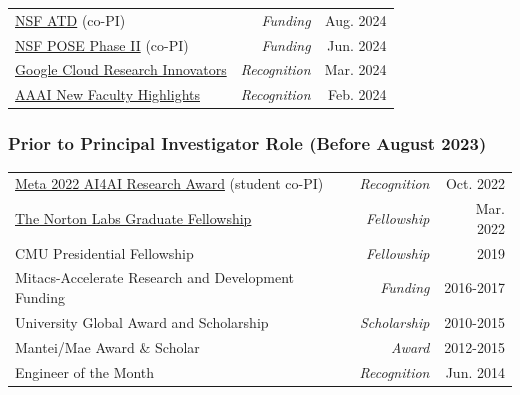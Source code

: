 \documentclass[margin,line,pifont,palatino,courier]{res}
\begin{document}
\begin{resume}
\begin{tabularx}{\textwidth}{@{}Xr@{\hskip 0.2in}r@{}}
\href{https://www.nsf.gov/awardsearch/show-award/?AWD_ID=2428039\&HistoricalAwards=false}{NSF ATD} (co-PI) & \textit{Funding} & \hfill Aug. 2024 \\
\href{https://www.nsf.gov/awardsearch/show-award/?AWD_ID=2346158\&HistoricalAwards=false}{NSF POSE Phase II} (co-PI) & \textit{Funding} & \hfill Jun. 2024 \\
\href{https://cloud.google.com/edu/researchers/innovators?hl=en}{Google Cloud Research Innovators} & \textit{Recognition} & \hfill Mar. 2024 \\
\href{https://aaai.org/aaai-24-conference/nfh-24-program/}{AAAI New Faculty Highlights} & \textit{Recognition} & \hfill Feb. 2024 \\
\end{tabularx}

\vspace{-0.1in}

\vspace{-0.2in}
\subsubsection*{Prior to Principal Investigator Role (Before August 2023)}
\vspace{-0.2in}
\begin{tabularx}{\textwidth}{@{}Xr@{\hskip 0.2in}r@{}}
\href{https://research.facebook.com/blog/2022/10/announcing-the-winners-of-the-2022-ai4ai-research-request-for-proposals/}{Meta 2022 AI4AI Research Award} (student co-PI) & \textit{Recognition} & \hfill Oct. 2022 \\
\href{https://web.archive.org/web/20240414184544/https://www.nortonlifelock.com/us/en/research-labs/news/2022-fellowship-winners/}{The Norton Labs Graduate Fellowship} & \textit{Fellowship} & \hfill Mar. 2022 \\
CMU Presidential Fellowship & \textit{Fellowship} & \hfill 2019 \\
Mitacs-Accelerate Research and Development Funding & \textit{Funding} & \hfill 2016-2017 \\
University Global Award and Scholarship & \textit{Scholarship} & \hfill 2010-2015 \\
Mantei/Mae Award \& Scholar & \textit{Award} & \hfill 2012-2015 \\
Engineer of the Month & \textit{Recognition} & \hfill Jun. 2014 \\
\end{tabularx}

\vspace{-0.1in}


\end{resume}
\end{document}
